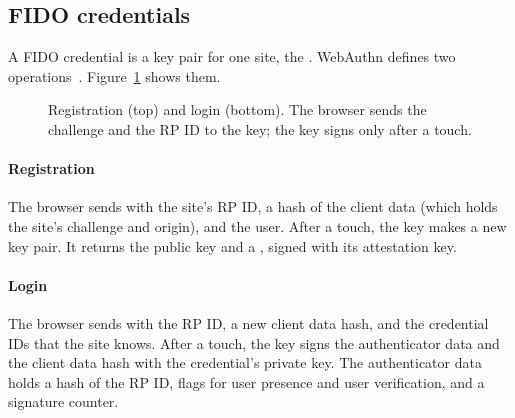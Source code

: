 \subsection{FIDO credentials}

A FIDO credential is a key pair for one site, the .
WebAuthn defines two operations~\cite{webauthn3}. Figure~\ref{fig:webauthn}
shows them.

\begin{figure}[t]
\centering
{}
\caption{Registration (top) and login (bottom). The browser sends the
challenge and the RP ID to the key; the key signs only after a touch.}
\label{fig:webauthn}
\end{figure}

\paragraph{Registration} The browser sends  with the
site's RP ID, a hash of the client data (which holds the site's challenge
and origin), and the user. After a touch, the key makes a new key pair. It
returns the public key and a , signed with its
attestation key.

\paragraph{Login} The browser sends  with the RP ID, a
new client data hash, and the credential IDs that the site knows. After a
touch, the key signs the authenticator data and the client data hash with
the credential's private key. The authenticator data holds a hash of the RP
ID, flags for user presence and user verification, and a signature counter.

